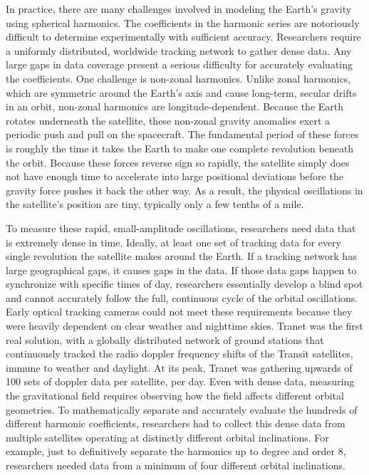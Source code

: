In practice, there are many challenges involved in modeling the Earth’s gravity using spherical harmonics. The coefficients in the harmonic series are notoriously difficult to determine experimentally with sufficient accuracy. Researchers require a uniformly distributed, worldwide tracking network to gather dense data. Any large gaps in data coverage present a serious difficulty for accurately evaluating the coefficients. One challenge is non-zonal harmonics. Unlike zonal harmonics, which are symmetric around the Earth's axis and cause long-term, secular drifts in an orbit, non-zonal harmonics are longitude-dependent. Because the Earth rotates underneath the satellite, these non-zonal gravity anomalies exert a periodic push and pull on the spacecraft. The fundamental period of these forces is roughly the time it takes the Earth to make one complete revolution beneath the orbit. Because these forces reverse sign so rapidly, the satellite simply does not have enough time to accelerate into large positional deviations before the gravity force pushes it back the other way. As a result, the physical oscillations in the satellite's position are tiny, typically only a few tenths of a mile.

To measure these rapid, small-amplitude oscillations, researchers need data that is extremely dense in time. Ideally, at least one set of tracking data for every single revolution the satellite makes around the Earth. If a tracking network has large geographical gaps, it causes gaps in the data. If those data gaps happen to synchronize with specific times of day, researchers essentially develop a blind spot and cannot accurately follow the full, continuous cycle of the orbital oscillations. Early optical tracking cameras could not meet these requirements because they were heavily dependent on clear weather and nighttime skies. Tranet was the first real solution, with a globally distributed network of ground stations that continuously tracked the radio doppler frequency shifts of the Transit satellites, immune to weather and daylight. At its peak, Tranet was gathering upwards of 100 sets of doppler data per satellite, per day.
Even with dense data, measuring the gravitational field requires observing how the field affects different orbital geometries. To mathematically separate and accurately evaluate the hundreds of different harmonic coefficients, researchers had to collect this dense data from multiple satellites operating at distinctly different orbital inclinations. For example, just to definitively separate the harmonics up to degree and order 8, researchers needed data from a minimum of four different orbital inclinations.

